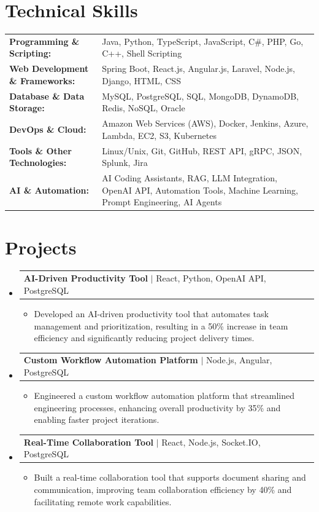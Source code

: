 \documentclass[letterpaper,10pt]{article}
\makeatletter
\newcommand{\resumeItem}[1]{
  \item{\fontsize{8pt}{9pt}\selectfont
    #1 \vspace{-3pt}
  }
}
\newcommand{\resumeProjectHeading}[2]{
    \item
    \begin{tabular*}{1.001\textwidth}{l@{\extracolsep{\fill}}r}
      \fontsize{8.5pt}{10pt}#1 & \textbf{\fontsize{8.5pt}{10pt} #2}\\
    \end{tabular*}\vspace{-7pt}
}
\newcommand{\resumeSubHeadingListStart}{\begin{itemize}[leftmargin=0pt, label={}]}
\newcommand{\resumeSubHeadingListEnd}{\end{itemize}}
\newcommand{\resumeItemListStart}{\begin{itemize}[leftmargin=*]}
\newcommand{\resumeItemListEnd}{\end{itemize}\vspace{-5pt}}
\makeatother
\begin{document}
\section{Technical Skills}
        \vspace{-14pt}
        \begin{table}[h]
            \fontsize{8pt}{9pt}\selectfont
            \begin{tabular}{p{0.3\linewidth} p{0.7\linewidth}}
                \textbf{Programming \& Scripting:} & Java, Python, TypeScript, JavaScript, C\#, PHP, Go, C++, Shell Scripting \\
                \textbf{Web Development \& Frameworks:} & Spring Boot, React.js, Angular.js, Laravel, Node.js, Django, HTML, CSS \\
                \textbf{Database \& Data Storage:} & MySQL, PostgreSQL, SQL, MongoDB, DynamoDB, Redis, NoSQL, Oracle \\
                \textbf{DevOps \& Cloud:} & Amazon Web Services (AWS), Docker, Jenkins, Azure, Lambda, EC2, S3, Kubernetes \\
                \textbf{Tools \& Other Technologies:} & Linux/Unix, Git, GitHub, REST API, gRPC, JSON, Splunk, Jira \\
                \textbf{AI \& Automation:} & AI Coding Assistants, RAG, LLM Integration, OpenAI API, Automation Tools, Machine Learning, Prompt Engineering, AI Agents \\
            \end{tabular}
        \end{table}
 \vspace{-18pt}

\section{Projects}
    \vspace{-5pt}
    \resumeSubHeadingListStart
          \resumeProjectHeading
            {\textbf{AI-Driven Productivity Tool} $|$ React, Python, OpenAI API, PostgreSQL}{}
            \resumeItemListStart
                \resumeItem{Developed an AI-driven productivity tool that automates task management and prioritization, resulting in a 50\% increase in team efficiency and significantly reducing project delivery times.}
            \resumeItemListEnd
        \vspace{-12pt}
    
        \resumeProjectHeading
            {\textbf{Custom Workflow Automation Platform} $|$ Node.js, Angular, PostgreSQL}{}
        \resumeItemListStart
                \resumeItem{Engineered a custom workflow automation platform that streamlined engineering processes, enhancing overall productivity by 35\% and enabling faster project iterations.}
        \resumeItemListEnd
      \vspace{-12pt}
      \resumeProjectHeading
        {\textbf{Real-Time Collaboration Tool} $|$ React, Node.js, Socket.IO, PostgreSQL}{}
    \resumeItemListStart
            \resumeItem{Built a real-time collaboration tool that supports document sharing and communication, improving team collaboration efficiency by 40\% and facilitating remote work capabilities.}
    \resumeItemListEnd
    \resumeSubHeadingListEnd
\end{document}
